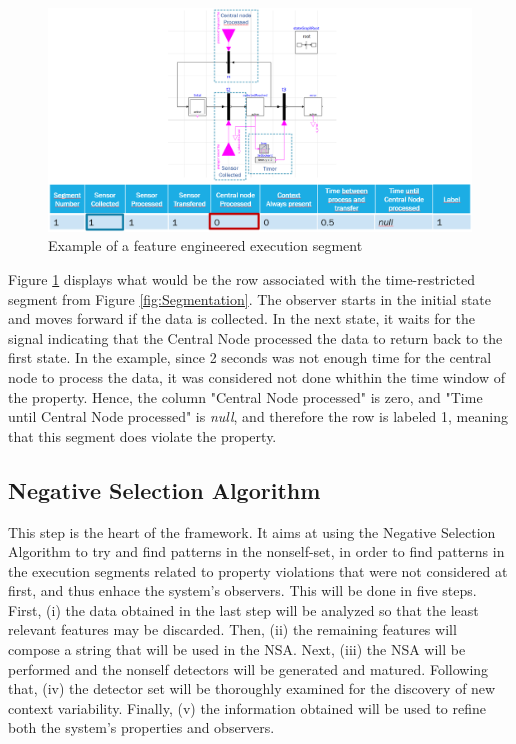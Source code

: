 \begin{figure}[!h]
	\centering
	\includegraphics[width=0.999\textwidth, keepaspectratio]{img/modelica_observer_signals.png}
	\caption{Example of a feature engineered execution segment}
	\label{fig:FeatureEngResult}
\end{figure}

Figure \ref{fig:FeatureEngResult} displays what would be the row associated with the time-restricted segment from Figure \ref{fig:Segmentation}. The observer starts in the initial state and moves forward if the data is collected. In the next state, it waits for the signal indicating that the Central Node processed the data to return back to the first state. In the example, since 2 seconds was not enough time for the central node to process the data, it was considered not done whithin the time window of the property. Hence, the column "Central Node processed" is zero, and "Time until Central Node processed" is \textit{null}, and therefore the row is labeled 1, meaning that this segment does violate the property.

\subsection{Negative Selection Algorithm}

This step is the heart of the framework. It aims at using the Negative Selection Algorithm to try and find patterns in the nonself-set, in order to find patterns in the execution segments related to property violations that were not considered at first, and thus enhace the system's observers. This will be done in five steps. First, (i) the data obtained in the last step will be analyzed so that the least relevant features may be discarded. Then, (ii) the remaining features will compose a string that will be used in the NSA. Next, (iii) the NSA will be performed and the nonself detectors will be generated and matured. Following that, (iv) the detector set will be thoroughly examined for the discovery of new context variability. Finally, (v) the information obtained will be used to refine both the system's properties and observers.

